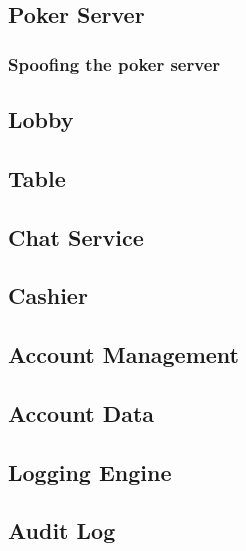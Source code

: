 \documentclass[a4paper,11pt]{report}
\begin{document}
\subsection{Poker Server}
\subsubsection{Spoofing the poker server}


\subsection{Lobby}
\subsection{Table}
\subsection{Chat Service}
\subsection{Cashier}
\subsection{Account Management}
\subsection{Account Data}
\subsection{Logging Engine}
\subsection{Audit Log}
\end{document}
